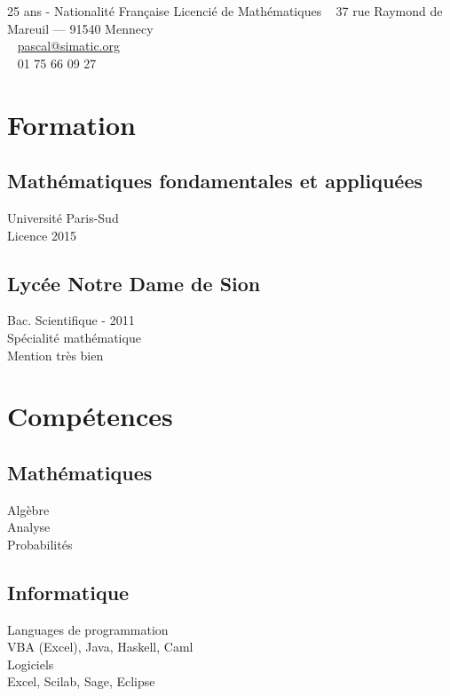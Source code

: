 \documentclass[]{cv-template}
\begin{document}
%
%
{25 ans - Nationalité Française}
{Licencié de Mathématiques}
{\faHome ~ 37 rue Raymond de Mareuil --- 91540 Mennecy \\
  \faEnvelope ~ \href{mailto:pascal@simatic.org}{pascal@simatic.org}\\
  \faPhone  ~  01 75 66 09 27}

%
%
\begin{minipage}[t]{0.34\textwidth} 

\section{Formation} 

\subsection{Mathématiques fondamentales \newline et appliquées}
\mycaret Université Paris-Sud \\
\mycaret Licence 2015
\sectionsep

\subsection{Lycée Notre Dame de Sion}
\mycaret Bac. Scientifique - 2011 \\
\mycaret Spécialité mathématique \\
\mycaret Mention très bien
\sectionsep

\section{Compétences}
\subsection{Mathématiques}
\mycaret Algèbre\\
\mycaret Analyse\\
\mycaret Probabilités\\
\sectionsep

\subsection{Informatique}
\mycaret Languages de programmation\\
VBA (Excel), Java, Haskell, Caml\\
\mycaret Logiciels \\
Excel, Scilab, Sage, Eclipse\\
\sectionsep


\end{minipage}
\end{document}
